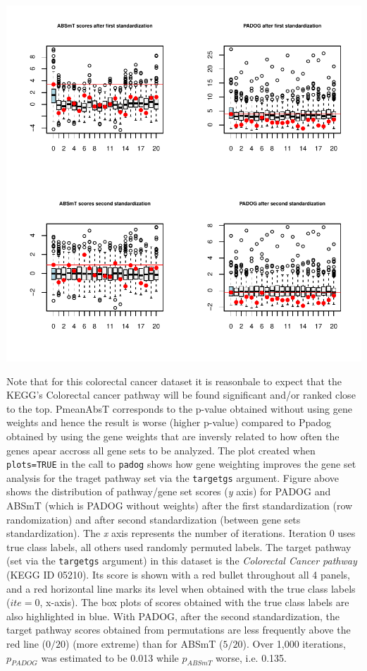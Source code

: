 \documentclass[11pt]{article}
\begin{document}
\includegraphics{PADOG-fig1}

Note that for this colorectal cancer dataset it is reasonbale to expect that the KEGG's Colorectal cancer pathway 
will be found significant and/or ranked close to the top. PmeanAbsT corresponds to the p-value
obtained without using gene weights and hence the result is worse (higher p-value) compared to Ppadog obtained by 
using the gene weights that are inversly related to how often the genes apear accross all gene sets to be analyzed.
The plot created when {\tt plots=TRUE} in the call to {\tt padog} shows how gene weighting 
improves the gene set analysis for the traget pathway set via the {\tt targetgs} argument. Figure above shows 
the distribution of pathway/gene set scores (\emph{y} axis)
for PADOG and ABSmT (which is PADOG without weights) after the first standardization (row randomization) and 
after second standardization (between gene sets standardization). The \emph{x} axis 
represents the number of iterations. Iteration 0 uses true class labels, all others used randomly permuted 
labels. The target pathway (set via the {\tt targetgs} argument) in this dataset is the 
\emph{Colorectal Cancer pathway} (KEGG ID 05210). Its score 
is shown with a red bullet throughout all 4 panels, and a red horizontal line marks its level when obtained 
with the true class labels ($ite=0$, x-axis). The box plots of scores obtained with the true class labels 
are also highlighted in blue. With PADOG, after the second standardization, the target pathway scores 
obtained from permutations are less frequently above the red line ($0/20$) (more extreme) than for ABSmT 
 ($5/20$). Over 1,000 iterations, $p_{PADOG}$ was estimated to be 0.013 while $p_{ABSmT}$ worse, i.e. 0.135.
\end{document}
